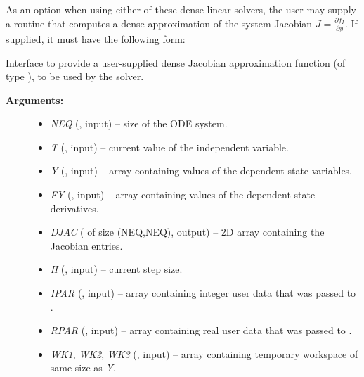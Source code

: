 \documentclass[letterpaper,10pt,english]{sphinxmanual}
\begin{document}
As an option when using either of these dense linear solvers, the user
may supply a routine that computes a dense approximation of the system
Jacobian $J = \frac{\partial f_I}{\partial y}$.  If supplied, it
must have the following form:

\begin{fulllineitems}
\label{f_interface/Usage:f/_/FARKDJAC}
Interface to provide a user-supplied dense Jacobian approximation
function (of type ), to be used by the
{\hyperref[f_interface/Usage:f/_/FARKDENSE]{}} solver.
\begin{description}
\item[{\textbf{Arguments:}}] \leavevmode\begin{itemize}
\item {} 
\emph{NEQ} (, input) -- size of the ODE system.

\item {} 
\emph{T} (, input) -- current value of the independent variable.

\item {} 
\emph{Y} (, input) -- array containing values of the dependent state variables.

\item {} 
\emph{FY} (, input) -- array containing values of the dependent state derivatives.

\item {} 
\emph{DJAC} ( of size (NEQ,NEQ), output) -- 2D array containing the Jacobian entries.

\item {} 
\emph{H} (, input) -- current step size.

\item {} 
\emph{IPAR} (, input) -- array containing integer user data that was passed to
{\hyperref[f_interface/Usage:f/_/FARKMALLOC]{}}.

\item {} 
\emph{RPAR} (, input) -- array containing real user data that was passed to
{\hyperref[f_interface/Usage:f/_/FARKMALLOC]{}}.

\item {} 
\emph{WK1}, \emph{WK2}, \emph{WK3}  (, input) -- array containing temporary workspace
of same size as \emph{Y}.


\end{itemize}
\end{description}
\end{fulllineitems}
\end{document}
